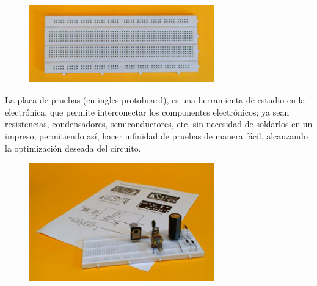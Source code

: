 \documentclass[12pt]{article}
\begin{document}
\begin{figure}[H]
	\begin{Center}
		\includegraphics[width=3.15in,height=1.33in]{./media/image2.jpeg}
	\end{Center}
\end{figure}



\par

La placa de pruebas (en ingles protoboard), es una herramienta de estudio en la  electrónica, que permite interconectar los componentes electrónicos; ya sean resistencias, condensadores, semiconductores, etc, sin necesidad de soldarlos en un impreso, permitiendo así, hacer infinidad de pruebas de manera fácil, alcanzando la optimización deseada del circuito.\par




\begin{figure}[H]
	\begin{Center}
		\includegraphics[width=3.15in,height=2.02in]{./media/image3.jpeg}
	\end{Center}
\end{figure}



\par
\end{document}

